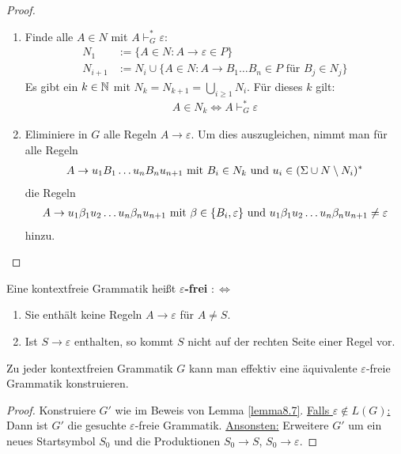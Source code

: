 \begin{proof}
	\begin{enumerate}
		\item Finde alle $A\in N$ mit $A\vdash_G^\ast\varepsilon$:
		\begin{align*}
			N_1&:=\big\lbrace A\in N:A\to\varepsilon\in P\big\rbrace\\
			N_{i+1}&:=N_i\cup\big\lbrace A\in N:A\to B_1\ldots B_n\in P\text{ für }B_j\in N_j\big\rbrace
		\end{align*}
		Es gibt ein $k\in\N$ mit $N_k=N_{k+1}=\bigcup\limits_{i\geq1}N_i$. Für dieses $k$ gilt:
		\begin{align*}
			A\in N_k\Longleftrightarrow A\vdash_G^\ast\varepsilon
		\end{align*}
		\item Eliminiere in $G$ alle Regeln $A\to\varepsilon$.
		Um dies auszugleichen, nimmt man für alle Regeln
		\begin{align*}
			A\to u_1B_1\ldots u_nB_nu_{n+1}\mit B_i\in N_k\text{ und }u_i\in(\Sigma\cup N\setminus N_i)^\ast
		\end{align*}
		die Regeln
		\begin{align*}
			A\to u_1\beta_1 u_2\ldots u_n\beta_n u_{n+1}\mit\beta\in\lbrace B_i,\varepsilon\rbrace\text{ und }u_1\beta_1 u_2\ldots u_n\beta_n u_{n+1}\neq\varepsilon
		\end{align*}
		hinzu.
	\end{enumerate}
\end{proof}

\begin{definition}\label{def8.8}
	Eine kontextfreie Grammatik heißt $\varepsilon$\textbf{-frei} $:\Longleftrightarrow$
	\begin{enumerate}[label=\arabic*)]
		\item Sie enthält keine Regeln $A\to\varepsilon$ für $A\neq S$.
		\item Ist $S\to\varepsilon$ enthalten, so kommt $S$ nicht auf der rechten Seite einer Regel vor.
	\end{enumerate}
\end{definition}

\begin{satz}\label{satz8.9}
	Zu jeder kontextfreien Grammatik $G$ kann man effektiv eine äquivalente $\varepsilon$-freie Grammatik konstruieren.
\end{satz}

\begin{proof}
	Konstruiere $G'$ wie im Beweis von Lemma \ref{lemma8.7}.\nl
	\underline{Falls $\varepsilon\not\in L(G)$:} Dann ist $G'$ die gesuchte $\varepsilon$-freie Grammatik.\nl
	\underline{Ansonsten:} Erweitere $G'$ um ein neues Startsymbol $S_0$ und die Produktionen $S_0\to S$, $S_0\to\varepsilon$.
\end{proof}

